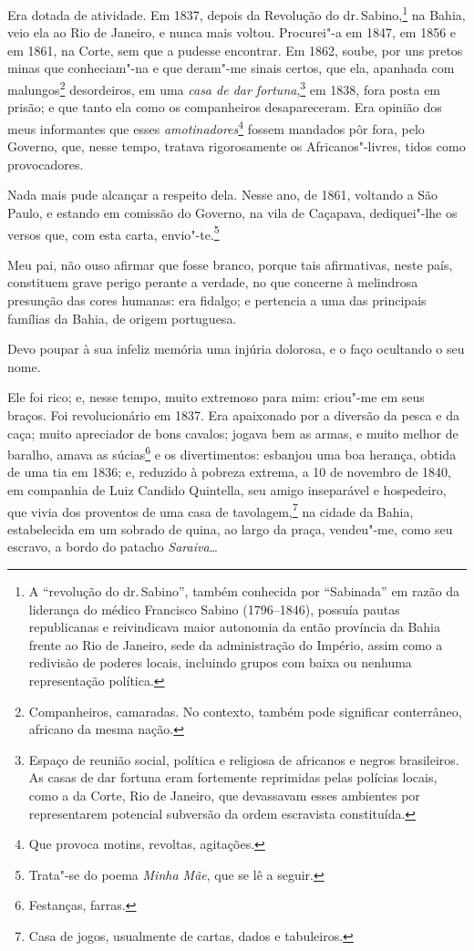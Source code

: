 Era dotada de atividade. Em 1837, depois da Revolução do dr.\,Sabino,\footnote{A ``revolução do dr.\,Sabino'', também conhecida por
  ``Sabinada'' em razão da liderança do médico Francisco Sabino
  (1796--1846), possuía pautas republicanas e reivindicava maior
  autonomia da então província da Bahia frente ao Rio de Janeiro, sede
  da administração do Império, assim como a redivisão de poderes locais,
  incluindo grupos com baixa ou nenhuma representação política.} na
Bahia, veio ela ao Rio de Janeiro, e nunca mais voltou. Procurei"-a em
1847, em 1856 e em 1861, na Corte, sem que a pudesse encontrar. Em 1862,
soube, por uns pretos minas que conheciam"-na e que deram"-me sinais
certos, que ela, apanhada com malungos\footnote{Companheiros,
  camaradas. No contexto, também pode significar conterrâneo, africano
  da mesma nação.} desordeiros, em uma \emph{casa de dar
fortuna},\footnote{Espaço de reunião social, política e religiosa de
  africanos e negros brasileiros. As casas de dar fortuna eram
  fortemente reprimidas pelas polícias locais, como a da Corte, Rio de
  Janeiro, que devassavam esses ambientes por representarem potencial
  subversão da ordem escravista constituída.} em 1838, fora posta em
prisão; e que tanto ela como os companheiros desapareceram. Era opinião
dos meus informantes que esses \emph{amotinadores}\footnote{Que
  provoca motins, revoltas, agitações.} fossem mandados pôr fora, pelo
Governo, que, nesse tempo, tratava rigorosamente os Africanos"-livres,
tidos como provocadores.

Nada mais pude alcançar a respeito dela. Nesse ano, de 1861, voltando a
São Paulo, e estando em comissão do Governo, na vila de Caçapava,
dediquei"-lhe os versos que, com esta carta, envio"-te.\footnote{Trata"-se
  do poema \emph{Minha Mãe}, que se lê a seguir.}

Meu pai, não ouso afirmar que fosse branco, porque tais afirmativas,
neste país, constituem grave perigo perante a verdade, no que concerne à
melindrosa presunção das cores humanas: era fidalgo; e pertencia a uma
das principais famílias da Bahia, de origem portuguesa.

Devo poupar à sua infeliz memória uma injúria dolorosa, e o faço
ocultando o seu nome.

Ele foi rico; e, nesse tempo, muito extremoso para mim: criou"-me em seus
braços. Foi revolucionário em 1837. Era apaixonado por a diversão da
pesca e da caça; muito apreciador de bons cavalos; jogava bem as armas,
e muito melhor de baralho, amava as súcias\footnote{Festanças, farras.}
e os divertimentos: esbanjou uma boa herança, obtida de uma tia em 1836;
e, reduzido à pobreza extrema, a 10 de novembro de 1840, em companhia de
Luiz Candido Quintella, seu amigo inseparável e hospedeiro, que vivia
dos proventos de uma casa de tavolagem,\footnote{Casa de jogos,
  usualmente de cartas, dados e tabuleiros.} na cidade da Bahia,
estabelecida em um sobrado de quina, ao largo da praça, vendeu"-me, como
seu escravo, a bordo do patacho \emph{Saraiva}\ldots{}

